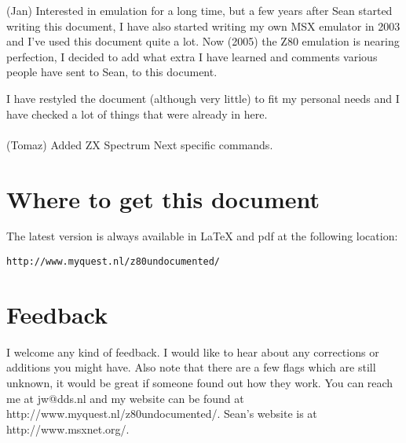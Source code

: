\documentclass[oneside,a4paper]{book}
\begin{document}
(Jan)
Interested in emulation for a long time, but a few years after Sean
started writing this document, I have also started writing my own MSX emulator 
in 2003 and I've used this document quite a lot. Now (2005) the Z80 emulation 
is nearing perfection, I decided to add what extra I have learned and 
comments various people have sent to Sean, to this document.

I have restyled the document (although very little) to fit my personal needs 
and I have checked a lot of things that were already in here.\\\\

(Tomaz)
Added ZX Spectrum Next specific commands.


\section{Where to get this document}

The latest version is always available in {\LaTeX} and pdf at 
the following location:

{\tt http://www.myquest.nl/z80undocumented/}


\section{Feedback}

I welcome any kind of feedback. I would like to hear about any corrections
or additions you might have. Also note that there are a few flags which 
are still unknown, it would be great if someone found out how they work.
You can reach me at {\ttfamily jw@dds.nl} and my website can be 
found at {\ttfamily http://www.myquest.nl/z80undocumented/}.
Sean's website is at {\ttfamily http://www.msxnet.org/}.


\pagebreak
\end{document}
